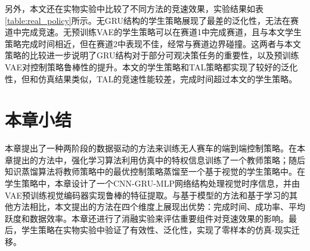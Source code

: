 \begin{table}[H]
\renewcommand{\arraystretch}{1.25}
\caption{不同控制策略在实物实验中的竞速效果比较}
\centering
{}
\label{table:real_policy}
\end{table}

另外，本文还在实物实验中比较了不同方法的竞速效果，实验结果如表\ref{table:real_policy}所示。无GRU结构的学生策略展现了最差的泛化性，无法在赛道中完成竞速。无预训练VAE的学生策略可以在赛道1中完成赛道，且与本文学生策略完成时间相近，但在赛道2中表现不佳，经常与赛道边界碰撞。这两者与本文策略的比较进一步说明了GRU结构对于部分可观决策任务的重要性，以及预训练VAE对控制策略鲁棒性的提升。本文的学生策略和TAL策略都实现了较好的泛化性，但和仿真结果类似，TAL的竞速性能较差，完成时间超过本文的学生策略。
\section{本章小结}
本章提出了一种两阶段的数据驱动的方法来训练无人赛车的端到端控制策略。在本章提出的方法中，强化学习算法利用仿真中的特权信息训练了一个教师策略；随后知识蒸馏算法将教师策略中的最优控制策略蒸馏至一个基于视觉的学生策略中。在学生策略中，本章设计了一个CNN-GRU-MLP网络结构处理视觉时序信息，并由VAE预训练视觉编码器实现鲁棒的特征提取。与基于模型的方法和基于学习的其他方法相比，本文提出的方法在四个维度上展现出优势：完成时间、成功率、平均跃度和数据效率。本章还进行了消融实验来评估重要组件对竞速效果的影响。最后，学生策略在实物实验中验证了有效性、泛化性，实现了零样本的仿真-现实迁移。
